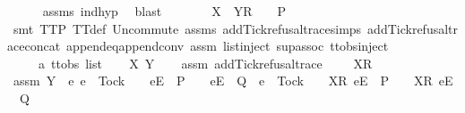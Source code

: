 \begin{isabellebody}
\ \ \ \ \isamarkupfalse%
\ {\isasymrho}{\isacharunderscore}assms\ ind{\isacharunderscore}hyp\ \isamarkupfalse%
\ blast\isanewline
\ \ \isamarkupfalse%
\ \isamarkupfalse%
\ {\isachardoublequoteopen}{\isasymrho}{\isacharprime}\ {\isacharat}\ {\isacharbrackleft}X\ {\isasymunion}\ Y{\isacharbrackright}\isactrlsub R\ {\isacharhash}\ {\isasymsigma}\ {\isasymin}\ P{\isachardoublequoteclose}\isanewline
\ \ \ \ \isamarkupfalse%
\ {\isacharparenleft}smt\ TT{}{\isacharunderscore}P\ TT{}{\isacharunderscore}def\ Un{\isacharunderscore}commute\ {\isasymrho}{\isacharunderscore}assms\ add{\isacharunderscore}Tick{\isacharunderscore}refusal{\isacharunderscore}trace{\isachardot}simps{\isacharparenleft}{}{\isacharparenright}\ add{\isacharunderscore}Tick{\isacharunderscore}refusal{\isacharunderscore}trace{\isacharunderscore}concat\ append{\isacharunderscore}eq{\isacharunderscore}append{\isacharunderscore}conv\ assm{}\ list{\isachardot}inject\ sup{\isacharunderscore}assoc\ ttobs{\isachardot}inject{\isacharparenleft}{}{\isacharparenright}{\isacharparenright}\isanewline
{}\isamarkupfalse%
\isanewline
\ \ \isamarkupfalse%
\ {\isasymrho}\ {\isasymrho}{\isacharprime}\ {\isasymsigma}\ {\isacharcolon}{\isacharcolon}\ {\isachardoublequoteopen}{\isacharprime}a\ ttobs\ list{\isachardoublequoteclose}\isanewline
\ \ \isamarkupfalse%
\ X\ Y\isanewline
\ \ \isamarkupfalse%
\ assm{}{\isacharcolon}\ {\isachardoublequoteopen}add{\isacharunderscore}Tick{\isacharunderscore}refusal{\isacharunderscore}trace\ {\isasymrho}\ {\isacharequal}\ {\isasymrho}{\isacharprime}\ {\isacharat}\ {\isacharbrackleft}X{\isacharbrackright}\isactrlsub R\ {\isacharhash}\ {\isasymsigma}{\isachardoublequoteclose}\isanewline
\ \ \isamarkupfalse%
\ assm{}{\isacharcolon}\ {\isachardoublequoteopen}Y\ {\isasyminter}\ {\isacharbraceleft}e{\isachardot}\ e\ {\isasymnoteq}\ Tock\ {\isasymand}\ {\isasymrho}{\isacharprime}\ {\isacharat}\ {\isacharbrackleft}{\isacharbrackleft}e{\isacharbrackright}\isactrlsub E{\isacharbrackright}\ {\isasymin}\ P\ {\isasymand}\ {\isasymrho}{\isacharprime}\ {\isacharat}\ {\isacharbrackleft}{\isacharbrackleft}e{\isacharbrackright}\isactrlsub E{\isacharbrackright}\ {\isasymin}\ Q\ {\isasymor}\ e\ {\isacharequal}\ Tock\ {\isasymand}\ {\isasymrho}{\isacharprime}\ {\isacharat}\ {\isacharbrackleft}{\isacharbrackleft}X{\isacharbrackright}\isactrlsub R{\isacharcomma}\ {\isacharbrackleft}e{\isacharbrackright}\isactrlsub E{\isacharbrackright}\ {\isasymin}\ P\ {\isasymand}\ {\isasymrho}{\isacharprime}\ {\isacharat}\ {\isacharbrackleft}{\isacharbrackleft}X{\isacharbrackright}\isactrlsub R{\isacharcomma}\ {\isacharbrackleft}e{\isacharbrackright}\isactrlsub E{\isacharbrackright}\ {\isasymin}\ Q{\isacharbraceright}\ {\isacharequal}\ {\isacharbraceleft}{\isacharbraceright}{\isachardoublequoteclose}\isanewline

\end{isabellebody}
